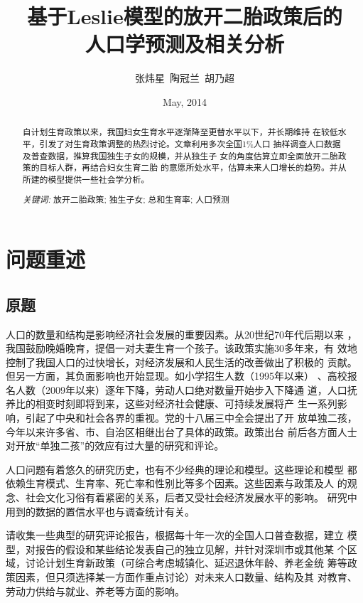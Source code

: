 \documentclass[a4paper]{article}
\title{基于Leslie模型的放开二胎政策后的\\人口学预测及相关分析}
\author{张炜星\, 陶冠兰\, 胡乃超}
\date{May, 2014}
\begin{document}
\maketitle
\begin{abstract}
自计划生育政策以来，我国妇女生育水平逐渐降至更替水平以下，并长期维持
在较低水平，引发了对生育政策调整的热烈讨论。文章利用多次全国1\%人口
抽样调查人口数据及普查数据，推算我国独生子女的规模，并从独生子
女的角度估算立即全面放开二胎政策的目标人群，再结合妇女生育二胎
的意愿所处水平，估算未来人口增长的趋势。并从所建的模型提供一些社会学分析。\par
\emph{关键词: }放开二胎政策; 独生子女; 总和生育率; 人口预测
\end{abstract}
\tableofcontents

\section{问题重述}
\subsection{原题}
人口的数量和结构是影响经济社会发展的重要因素。从20世纪70年代后期以来
，我国鼓励晚婚晚育，提倡一对夫妻生育一个孩子。该政策实施30多年来，有
效地控制了我国人口的过快增长，对经济发展和人民生活的改善做出了积极的
贡献。但另一方面，其负面影响也开始显现。如小学招生人数（1995年以来）
、高校报名人数（2009年以来）逐年下降，劳动人口绝对数量开始步入下降通
道，人口抚养比的相变时刻即将到来，这些对经济社会健康、可持续发展将产
生一系列影响，引起了中央和社会各界的重视。党的十八届三中全会提出了开
放单独二孩，今年以来许多省、市、自治区相继出台了具体的政策。政策出台
前后各方面人士对开放“单独二孩”的效应有过大量的研究和评论。\par
人口问题有着悠久的研究历史，也有不少经典的理论和模型。这些理论和模型
都依赖生育模式、生育率、死亡率和性别比等多个因素。这些因素与政策及人
的观念、社会文化习俗有着紧密的关系，后者又受社会经济发展水平的影响。
研究中用到的数据的置信水平也与调查统计有关。\par
请收集一些典型的研究评论报告，根据每十年一次的全国人口普查数据，建立
模型，对报告的假设和某些结论发表自己的独立见解，并针对深圳市或其他某
个区域，讨论计划生育新政策（可综合考虑城镇化、延迟退休年龄、养老金统
筹等政策因素，但只须选择某一方面作重点讨论）对未来人口数量、结构及其
对教育、劳动力供给与就业、养老等方面的影响。
\end{document}
